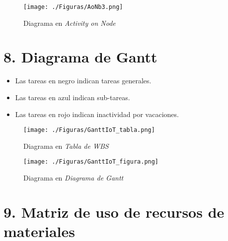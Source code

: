 \documentclass[11pt]{charter}
\begin{document}
\begin{figure}[htpb]
\centering 
\texttt{[image: ./Figuras/AoNb3.png]}
\caption{Diagrama en \textit{Activity on Node}}
\label{fig:AoN}
\end{figure}

\vspace{10px}

\section{8. Diagrama de Gantt}
\label{sec:gantt}

\begin{itemize}
	\item Las tareas en negro indican tareas generales. 
	\item Las tareas en azul indican sub-tareas.
	\item Las tareas en rojo indican inactividad por vacaciones.
\end{itemize}

\begin{figure}[htpb]
\centering 
\texttt{[image: ./Figuras/GanttIoT\_tabla.png]}
\caption{Diagrama en \textit{Tabla de WBS}}
\label{fig:AoN}
\end{figure}


\begin{figure}[htpb]
\centering 
\texttt{[image: ./Figuras/GanttIoT\_figura.png]}
\caption{Diagrama en \textit{Diagrama de Gantt}}
\label{fig:AoN}
\end{figure}


\section{9. Matriz de uso de recursos de materiales}
\label{sec:recursos}
\end{document}
